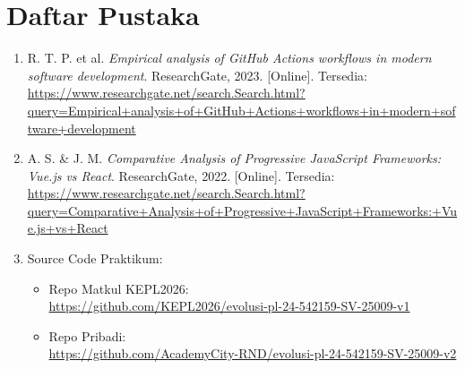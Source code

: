\chapter{Daftar Pustaka}

\begin{enumerate}
    \item \label{cicd} R. T. P. et al. \textit{Empirical analysis of GitHub Actions workflows in modern software development}. ResearchGate, 2023. [Online]. Tersedia: \url{https://www.researchgate.net/search.Search.html?query=Empirical+analysis+of+GitHub+Actions+workflows+in+modern+software+development}
    
    \item \label{vue} A. S. \& J. M. \textit{Comparative Analysis of Progressive JavaScript Frameworks: Vue.js vs React}. ResearchGate, 2022. [Online]. Tersedia: \url{https://www.researchgate.net/search.Search.html?query=Comparative+Analysis+of+Progressive+JavaScript+Frameworks:+Vue.js+vs+React}
    
    \item \label{sourcecode} Source Code Praktikum:
    \begin{itemize}
        \item Repo Matkul KEPL2026:\\
        \url{https://github.com/KEPL2026/evolusi-pl-24-542159-SV-25009-v1}
        
        \item Repo Pribadi:\\
        \url{https://github.com/AcademyCity-RND/evolusi-pl-24-542159-SV-25009-v2}
    \end{itemize}
\end{enumerate}
